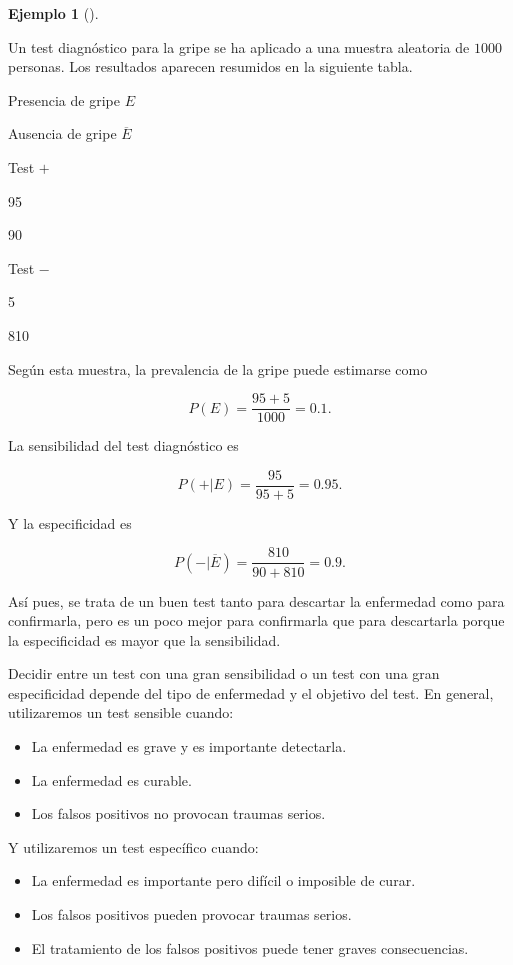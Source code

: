\documentclass[
  a4paper,
]{scrreport}
\providecommand{\tightlist}{%
  \setlength{\itemsep}{0pt}\setlength{\parskip}{0pt}}\usepackage{longtable,booktabs,array}
\theoremstyle{plain}
\theoremstyle{definition}
\newtheorem{example}{Ejemplo}[chapter]
\theoremstyle{definition}
\theoremstyle{remark}
\begin{document}
\begin{example}[]\protect\hypertarget{exm-sensibilidad-especificidad}{}\label{exm-sensibilidad-especificidad}

Un test diagnóstico para la gripe se ha aplicado a una muestra aleatoria
de \(1000\) personas. Los resultados aparecen resumidos en la siguiente
tabla.

Presencia de gripe \(E\)

Ausencia de gripe \(\overline E\)

Test \(+\)

95

90

Test \(−\)

5

810

Según esta muestra, la prevalencia de la gripe puede estimarse como

\[P(E) = \frac{95+5}{1000} = 0.1.\]

La sensibilidad del test diagnóstico es

\[P(+|E) = \frac{95}{95+5}= 0.95.\]

Y la especificidad es

\[P(-|\overline{E}) = \frac{810}{90+810}=0.9.\]

Así pues, se trata de un buen test tanto para descartar la enfermedad
como para confirmarla, pero es un poco mejor para confirmarla que para
descartarla porque la especificidad es mayor que la sensibilidad.

\end{example}

Decidir entre un test con una gran sensibilidad o un test con una gran
especificidad depende del tipo de enfermedad y el objetivo del test. En
general, utilizaremos un test sensible cuando:

\begin{itemize}
\tightlist
\item
  La enfermedad es grave y es importante detectarla.
\item
  La enfermedad es curable.
\item
  Los falsos positivos no provocan traumas serios.
\end{itemize}

Y utilizaremos un test específico cuando:

\begin{itemize}
\tightlist
\item
  La enfermedad es importante pero difícil o imposible de curar.
\item
  Los falsos positivos pueden provocar traumas serios.
\item
  El tratamiento de los falsos positivos puede tener graves
  consecuencias.
\end{itemize}
\end{document}
